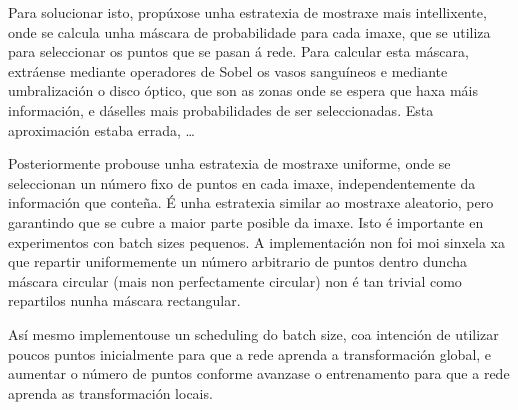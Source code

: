 Para solucionar isto, propúxose unha estratexia de mostraxe mais intellixente, onde se calcula unha máscara de probabilidade para cada imaxe, que se utiliza para seleccionar os puntos que se pasan á rede.
Para calcular esta máscara, extráense mediante operadores de Sobel os vasos sanguíneos e mediante umbralización o disco óptico, que son as zonas onde se espera que haxa máis información, e dáselles mais probabilidades de ser seleccionadas.
Esta aproximación estaba errada, \dots

Posteriormente probouse unha estratexia de mostraxe uniforme, onde se seleccionan un número fixo de puntos en cada imaxe, independentemente da información que conteña.
É unha estratexia similar ao mostraxe aleatorio, pero garantindo que se cubre a maior parte posible da imaxe. Isto é importante en experimentos con batch sizes pequenos.
A implementación non foi moi sinxela xa que repartir uniformemente un número arbitrario de puntos dentro duncha máscara circular (mais non perfectamente circular) non é tan trivial como repartilos nunha máscara rectangular.

Así mesmo implementouse un scheduling do batch size, coa intención de utilizar poucos puntos inicialmente para que a rede aprenda a transformación global, e aumentar o número de puntos conforme avanzase o entrenamento para que a rede aprenda as transformación locais.

